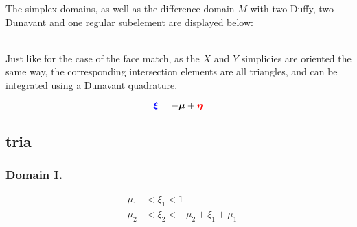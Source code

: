 \documentclass{article}
\begin{document}
The simplex domains, as well as the difference domain $M$ with two Duffy, two Dunavant and one regular subelement are displayed below:\\
%
%
%
 \\
%
Just like for the case of the face match, as the $X$ and $Y$ simplicies are oriented the same way, the corresponding intersection elements are all triangles, and can be integrated using a Dunavant quadrature.




\begin{equation}
{\color{blue}\bm{\xi}} = -\bm{\mu} + {\color{red}\bm{\eta}}
\end{equation}



\subsection{tria}

\newcommand{\commontri}{
\path [draw=gray] (1,0) -- (1,1) -- (0,1) -- (-1,0) -- (-1,-1) -- (0,-1) -- cycle;
\path [draw=gray] (-1,0) -- (1,0);
\path [draw=gray] (0,-1) -- (0,1);
\path [draw=gray] (-1,-1) -- (1,1);
\path [draw, ->] (-.2,0) -- (1.2,0) node [anchor = west] {$\xi_1$};
\path [draw, ->] (0,-.2) -- (0,1.2) node [anchor = south] {$\xi_2$};
\path [fill=red, opacity=.5] (0-\m,0-\p) -- (1-\m,0-\p) -- (1-\m,1-\p) -- cycle;
\path [fill = blue, opacity=.5] (0,0) -- (1,0) -- (1,1) -- cycle;
}


\subsubsection{Domain I.}
%
%
\begin{align}
-\mu_1 &< \xi_1 < 1 \nonumber \\
-\mu_2 &< \xi_2 < -\mu_2 + \xi_1+\mu_1 \nonumber
\end{align}
\end{document}
